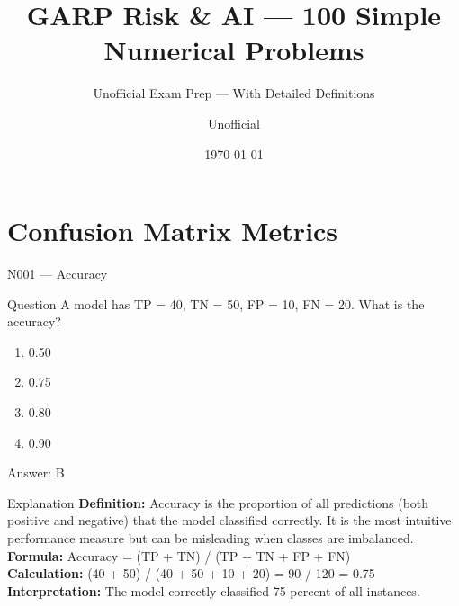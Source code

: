 \documentclass[aspectratio=169,8pt]{beamer}
\title[GARP RAI]{GARP Risk \& AI --- 100 Simple Numerical Problems}
\subtitle{Unofficial Exam Prep --- With Detailed Definitions}
\author{Unofficial}
\date{\today}
\begin{document}
	
	\begin{frame}
		\titlepage
	\end{frame}
	
	\section{Confusion Matrix Metrics}
	
	\begin{frame}{N001 --- Accuracy}
		\begin{block}{Question}
			A model has TP = 40, TN = 50, FP = 10, FN = 20. What is the accuracy?
			\begin{enumerate}
				\item 0.50
				\item 0.75
				\item 0.80
				\item 0.90
			\end{enumerate}
		\end{block}
		\begin{exampleblock}{Answer: B}\end{exampleblock}
		\begin{block}{Explanation}
			\textbf{Definition:} Accuracy is the proportion of all predictions (both positive and negative) that the model classified correctly. It is the most intuitive performance measure but can be misleading when classes are imbalanced.\\
			\textbf{Formula:} Accuracy = (TP + TN) / (TP + TN + FP + FN)\\
			\textbf{Calculation:} (40 + 50) / (40 + 50 + 10 + 20) = 90 / 120 = 0.75\\
			\textbf{Interpretation:} The model correctly classified 75 percent of all instances.
		\end{block}
	\end{frame}
	
\end{document}
